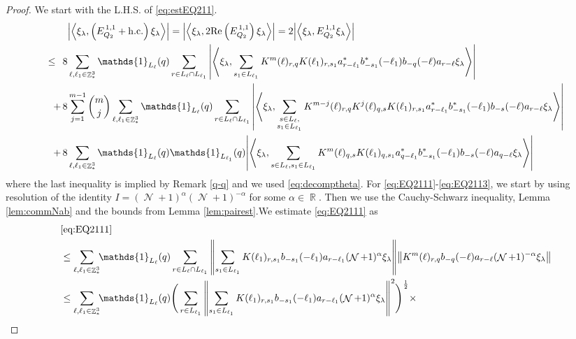 \documentclass[12pt,a4paper]{article}
\numberwithin{equation}{section}
\newcommand{\1}{\mathbb{I}}
\DeclareMathOperator{\R}{\mathbb{R}}
\DeclareMathOperator{\Z}{\mathbb{Z}}
\DeclareMathOperator{\NN}{\mathcal{N}}
\newcommand{\half}{\frac{1}{2}}
\newcommand{\eva}[1]{\left\langle #1 \right\rangle}
\theoremstyle{plain}
\theoremstyle{definition}
\theoremstyle{remark}
\theoremstyle{plain}
\theoremstyle{definition}
\theoremstyle{remark}
\begin{document}
\begin{proof}
  We start with the L.H.S. of \eqref{eq:estEQ211}.
  \begin{align}
  	&\abs{\eva{\xi_\lambda,\left(E^{\,1,1}_{Q_2}+\mathrm{h.c.}\right) \xi_\lambda }} = \abs{\eva{\xi_\lambda,2\mathrm{Re}\left(E^{\,1,1}_{Q_2}\right) \xi_\lambda }} = 2\abs{\eva{\xi_\lambda, E^{\,1,1}_{Q_2} \xi_\lambda }}\nonumber\\
  	\leq\,\;8& \sum\limits_{\ell, \ell_1\in \Z^3_*} \mathds{1}_{L_{\ell}}(q) \sum\limits_{r\in L_{\ell} \cap L_{\ell_1}} \abs{\eva{\xi_\lambda, \sum\limits_{s_1\in L_{\ell_1}} K^m(\ell )_{r,q} K(\ell_1)_{r,s_1} a^*_{r-\ell_1}  b^*_{-s_1}(-\ell_1) b_{-q}(-\ell) a_{r-\ell}  \xi_\lambda }}\label{eq:EQ2111}\\
  	+\,8& \sum\limits_{j=1}^{m-1} {{m}\choose j} \sum\limits_{\ell, \ell_1\in \Z^3_*}\mathds{1}_{L_{\ell}}(q) \sum\limits_{r\in L_{\ell} \cap L_{\ell_1}}  \abs{\eva{\xi_\lambda, \sum\limits_{\substack{s \in L_{\ell},\\ s_1\in L_{\ell_1}}} K^{m-j}(\ell)_{r,q} K^{j}(\ell)_{q,s} K(\ell_1)_{r,s_1} a^*_{r-\ell_1} b^*_{-s_1}(-\ell_1) b_{-s}(-\ell) a_{r-\ell} \xi_\lambda }}\label{eq:EQ2112}\\
  	+\,8&\sum\limits_{\ell, \ell_1\in \Z^3_*} \mathds{1}_{L_{\ell}}(q) \mathds{1}_{L_{\ell_1}}(q) \abs{\eva{\xi_\lambda,  \sum\limits_{s \in L_{\ell}, s_1\in L_{\ell_1}} K^m(\ell)_{q,s}K(\ell_1)_{q,s_1}
  	a^*_{q-\ell_1} b^*_{-s_1}(-\ell_1) b_{-s}(-\ell) a_{q-\ell} \xi_\lambda}} \label{eq:EQ2113}
  \end{align}
  where the last inequality is implied by Remark \ref{q-q} and we used \eqref{eq:decomptheta}.
  For \eqref{eq:EQ2111}-\eqref{eq:EQ2113}, we start by using resolution of the identity $I = (\NN+1)^{\alpha}(\NN+1)^{-\alpha}$ for some $\alpha \in \R$. Then we use the Cauchy-Schwarz inequality, Lemma \ref{lem:commNab} and the bounds from Lemma \ref{lem:pairest}.We estimate \eqref{eq:EQ2111} as
\begin{align}
	&\eqref{eq:EQ2111}\nonumber\\
	&\leq\sum\limits_{\ell,\ell_1 \in \Z^3_*} \!\!\mathds{1}_{L_\ell}(q) \sum\limits_{ r \in L_\ell \cap L_{\ell_1}}    \norm{ \sum\limits_{s_1 \in L_{\ell_1}} K(\ell_1)_{r,s_1} b_{-s_1}(-\ell_1)  a_{r-\ell_1} (\NN+1)^{\alpha}\xi_\lambda}\norm{ K^{m}(\ell)_{r,q}   b_{-q}(-\ell) a_{r-\ell} (\NN+1)^{-\alpha}\xi_\lambda } \nonumber\\
 	&\leq \sum\limits_{\ell,\ell_1 \in \Z^3_*} \!\!\mathds{1}_{L_\ell}(q) \Bigg( \sum\limits_{r \in L_{\ell_1}} \norm{\sum\limits_{s_1 \in L_{\ell_1}} K(\ell_1)_{r,s_1} b_{-s_1}(-\ell_1) a_{r-\ell_1} (\NN+1)^{\alpha}\xi_\lambda}^2\Bigg)^\half \times\nonumber\\

\end{align}
\end{proof}
\end{document}
